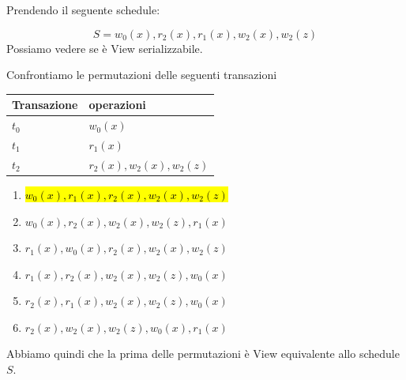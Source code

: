 \begin{exmp}
    Prendendo il seguente schedule:

    \[ S = w_0(x), r_2(x), r_1(x), w_2(x), w_2(z) \]
    Possiamo vedere se è View serializzabile.

    Confrontiamo le permutazioni delle seguenti transazioni

    \begin{center}
        \begin{tabularx}{10cm}{|p{25mm}|X|}
            \hline
            \rowcolor{gray!30}
            \textbf{Transazione} & \textbf{operazioni}\\
            \hline
            $t_0$& $w_0(x)$\\
            $t_1$& $r_1(x)$\\
            $t_2$& $r_2(x), w_2(x), w_2(z)$\\
            \hline
        \end{tabularx}
    \end{center}

    \begin{enumerate}
        \item \hl{$w_0(x), r_1(x), r_2(x), w_2(x), w_2(z)$}
        \item $w_0(x), r_2(x), w_2(x), w_2(z), r_1(x)$
        \item $r_1(x), w_0(x), r_2(x), w_2(x), w_2(z)$
        \item $r_1(x), r_2(x), w_2(x), w_2(z), w_0(x)$
        \item $r_2(x), r_1(x), w_2(x), w_2(z), w_0(x)$
        \item $r_2(x), w_2(x), w_2(z), w_0(x), r_1(x)$
    \end{enumerate}

    Abbiamo quindi che la prima delle permutazioni è View equivalente allo schedule $S$.
\end{exmp}